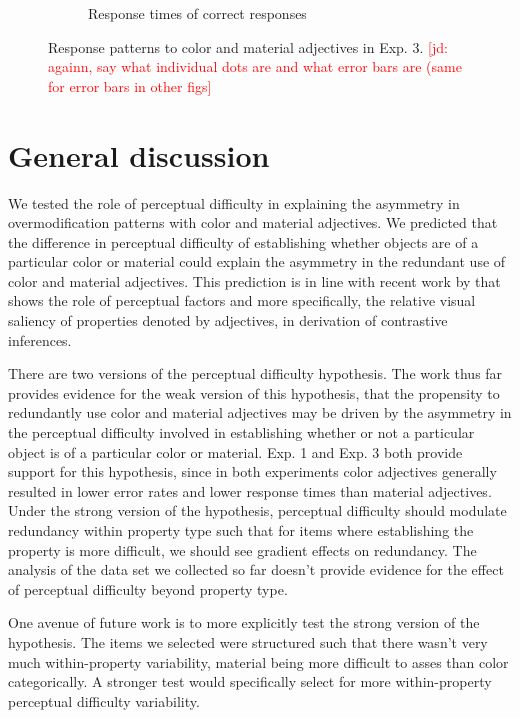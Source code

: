 \documentclass[12pt,letterpaper]{article}
\newcommand{\jd}[1]{\textcolor{Red}{[jd: #1]}}
\begin{document}
\begin{figure}[ht]
\begin{subfigure}{.4 \textwidth}
   \caption{Response times of correct responses}
   \label{fig:exp3_b}
   \end{subfigure}
   \caption{Response patterns to color and material adjectives in Exp. 3. \jd{againn, say what individual dots are and what error bars are (same for error bars in other figs}}
   \label{fig:exp3}
\end{figure}   

\section{General discussion} 

We tested the role of perceptual difficulty in explaining the asymmetry in overmodification patterns with color and material adjectives. We predicted that the difference in perceptual difficulty of establishing whether objects are of a particular color or material could explain the asymmetry in the redundant use of color and material adjectives. This prediction is in line with recent work by \citet{RubioEtAl2019} that shows the role of perceptual factors and more specifically, the relative visual saliency of properties denoted by adjectives, in derivation of contrastive inferences.

There are two versions of the perceptual difficulty hypothesis. The work thus far provides evidence for the weak version of this hypothesis, that the propensity to redundantly use color and material adjectives may be driven by the asymmetry in the perceptual difficulty involved in establishing whether or not a particular object is of a particular color or material. Exp. 1 and Exp. 3 both provide support for this hypothesis, since in both experiments color adjectives generally resulted in lower error rates and lower response times than material adjectives. Under the strong version of the hypothesis, perceptual difficulty should modulate redundancy within property type such that for items where establishing the property is more difficult, we should see gradient effects on redundancy. The analysis of the data set we collected so far doesn't provide evidence for the effect of perceptual difficulty beyond property type. 

One avenue of future work is to more explicitly test the strong version of the hypothesis. The items we selected were structured such that there wasn't very much within-property variability, material being more difficult to asses than color categorically. A stronger test would specifically select for more within-property perceptual difficulty variability.
\end{document}

